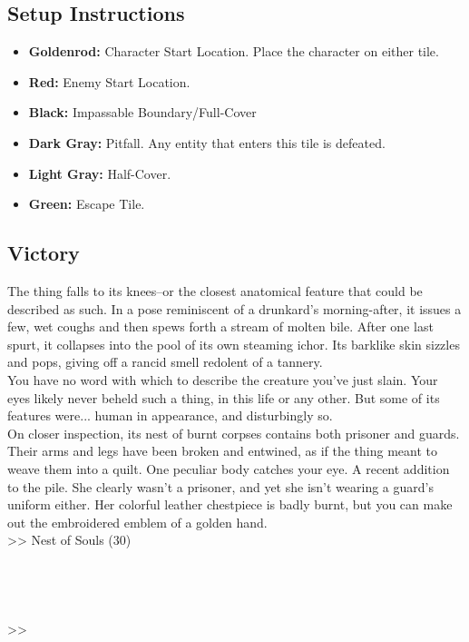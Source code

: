 \subsection*{Setup Instructions}
\begin{itemize}
\item \textbf{Goldenrod:} Character Start Location. Place the character on either tile.
\item \textbf{Red:} Enemy Start Location.
\item \textbf{Black:} Impassable Boundary/Full-Cover
\item \textbf{Dark Gray:} Pitfall. Any entity that enters this tile is defeated.
\item \textbf{Light Gray:} Half-Cover.
\item \textbf{Green:} Escape Tile.
\end{itemize}

\pagebreak

\subsection*{Victory}
The thing falls to its knees--or the closest anatomical feature that could be described as such. In a pose reminiscent of a drunkard’s morning-after, it issues a few, wet coughs and then spews forth a stream of molten bile. After one last spurt, it collapses into the pool of its own steaming ichor. Its barklike skin sizzles and pops, giving off a rancid smell redolent of a tannery.\\

You have no word with which to describe the creature you’ve just slain. Your eyes likely never beheld such a thing, in this life or any other. But some of its features were... human in appearance, and disturbingly so.\\

On closer inspection, its nest of burnt corpses contains both prisoner and guards. Their arms and legs have been broken and entwined, as if the thing meant to weave them into a quilt. One peculiar body catches your eye. A recent addition to the pile. She clearly wasn’t a prisoner, and yet she isn't wearing a guard’s uniform either. Her colorful leather chestpiece is badly burnt, but you can make out the embroidered emblem of a golden hand.\\

>> Nest of Souls (30)\\
\\
\\
\\
\\
>> 


